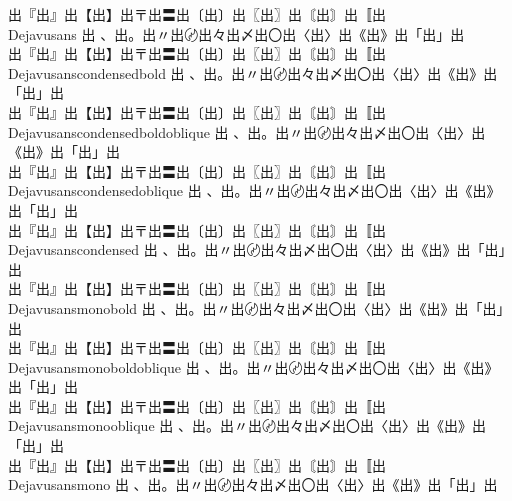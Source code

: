 \begin{tabbing}
\> {\mktsFontfileDejavusansoblique{}出『出』出【出】出〒出〓出〔出〕出〖出〗出〘出〙出〚出} \\
Dejavusans \> {\mktsFontfileDejavusans{}出 、出。出〃出〄出々出〆出〇出〈出〉出《出》出「出」出}\\
\> {\mktsFontfileDejavusans{}出『出』出【出】出〒出〓出〔出〕出〖出〗出〘出〙出〚出} \\
Dejavusanscondensedbold \> {\mktsFontfileDejavusanscondensedbold{}出 、出。出〃出〄出々出〆出〇出〈出〉出《出》出「出」出}\\
\> {\mktsFontfileDejavusanscondensedbold{}出『出』出【出】出〒出〓出〔出〕出〖出〗出〘出〙出〚出} \\
Dejavusanscondensedboldoblique \> {\mktsFontfileDejavusanscondensedboldoblique{}出 、出。出〃出〄出々出〆出〇出〈出〉出《出》出「出」出}\\
\> {\mktsFontfileDejavusanscondensedboldoblique{}出『出』出【出】出〒出〓出〔出〕出〖出〗出〘出〙出〚出} \\
Dejavusanscondensedoblique \> {\mktsFontfileDejavusanscondensedoblique{}出 、出。出〃出〄出々出〆出〇出〈出〉出《出》出「出」出}\\
\> {\mktsFontfileDejavusanscondensedoblique{}出『出』出【出】出〒出〓出〔出〕出〖出〗出〘出〙出〚出} \\
Dejavusanscondensed \> {\mktsFontfileDejavusanscondensed{}出 、出。出〃出〄出々出〆出〇出〈出〉出《出》出「出」出}\\
\> {\mktsFontfileDejavusanscondensed{}出『出』出【出】出〒出〓出〔出〕出〖出〗出〘出〙出〚出} \\
Dejavusansmonobold \> {\mktsFontfileDejavusansmonobold{}出 、出。出〃出〄出々出〆出〇出〈出〉出《出》出「出」出}\\
\> {\mktsFontfileDejavusansmonobold{}出『出』出【出】出〒出〓出〔出〕出〖出〗出〘出〙出〚出} \\
Dejavusansmonoboldoblique \> {\mktsFontfileDejavusansmonoboldoblique{}出 、出。出〃出〄出々出〆出〇出〈出〉出《出》出「出」出}\\
\> {\mktsFontfileDejavusansmonoboldoblique{}出『出』出【出】出〒出〓出〔出〕出〖出〗出〘出〙出〚出} \\
Dejavusansmonooblique \> {\mktsFontfileDejavusansmonooblique{}出 、出。出〃出〄出々出〆出〇出〈出〉出《出》出「出」出}\\
\> {\mktsFontfileDejavusansmonooblique{}出『出』出【出】出〒出〓出〔出〕出〖出〗出〘出〙出〚出} \\
Dejavusansmono \> {\mktsFontfileDejavusansmono{}出 、出。出〃出〄出々出〆出〇出〈出〉出《出》出「出」出}\\

\end{tabbing}
